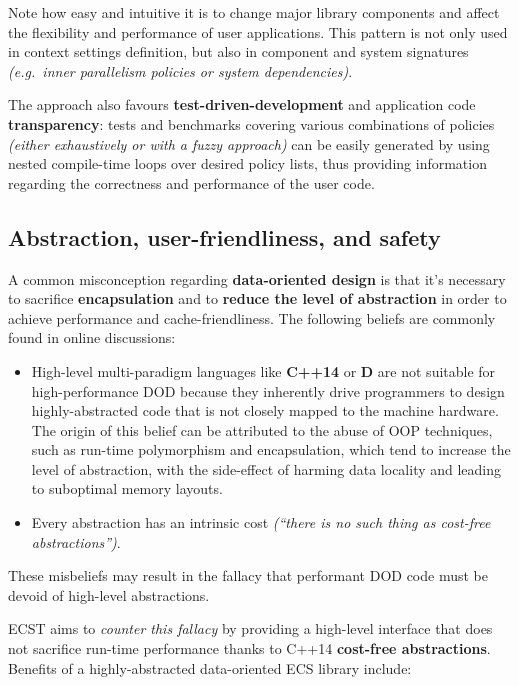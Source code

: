 \documentclass[twoside, 12pt, a4paper, openany]{book}
\begin{document}
Note how easy and intuitive it is to change major library components and
affect the flexibility and performance of user applications. This
pattern is not only used in context settings definition, but also in
component and system signatures \emph{(e.g.~inner parallelism policies
or system dependencies)}.

The approach also favours \textbf{test-driven-development} and
application code \textbf{transparency}: tests and benchmarks covering
various combinations of policies \emph{(either exhaustively or with a
fuzzy approach)} can be easily generated by using nested compile-time
loops over desired policy lists, thus providing information regarding
the correctness and performance of the user code.

\subsection{Abstraction, user-friendliness, and
safety}\label{abstraction-user-friendliness-and-safety}

A common misconception regarding \textbf{data-oriented design} is that
it's necessary to sacrifice \textbf{encapsulation} and to \textbf{reduce
the level of abstraction} in order to achieve performance and
cache-friendliness. The following beliefs are commonly found in online
discussions:

\begin{itemize}
\item
  High-level multi-paradigm languages like \textbf{C++14} or \textbf{D}
  are not suitable for high-performance DOD because they inherently
  drive programmers to design highly-abstracted code that is not closely
  mapped to the machine hardware. The origin of this belief can be
  attributed to the abuse of OOP techniques, such as run-time
  polymorphism and encapsulation, which tend to increase the level of
  abstraction, with the side-effect of harming data locality and leading
  to suboptimal memory layouts.
\item
  Every abstraction has an intrinsic cost \emph{(``there is no such
  thing as cost-free abstractions'')}.
\end{itemize}

These misbeliefs may result in the fallacy that performant DOD code must
be devoid of high-level abstractions.

ECST aims to \emph{counter this fallacy} by providing a high-level
interface that does not sacrifice run-time performance thanks to C++14
\textbf{cost-free abstractions}. Benefits of a highly-abstracted
data-oriented ECS library include:
\end{document}
